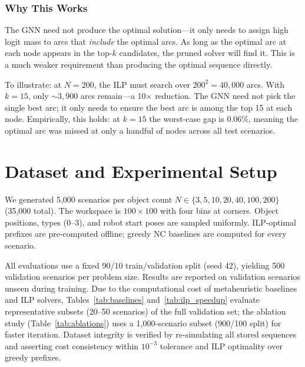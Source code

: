 \documentclass[conference]{IEEEtran}
\begin{document}
\subsubsection{Why This Works} The GNN need not produce the optimal solution---it only needs to assign high logit mass to arcs that \emph{include} the optimal arcs. As long as the optimal arc at each node appears in the top-$k$ candidates, the pruned solver will find it. This is a much weaker requirement than producing the optimal sequence directly.

To illustrate: at $N{=}200$, the ILP must search over $200^2 = 40{,}000$ arcs. With $k{=}15$, only ${\sim}3{,}900$ arcs remain---a 10$\times$ reduction. The GNN need not pick the single best arc; it only needs to ensure the best arc is among the top 15 at each node. Empirically, this holds: at $k{=}15$ the worst-case gap is 0.06\%, meaning the optimal arc was missed at only a handful of nodes across all test scenarios.

\section{Dataset and Experimental Setup}\label{sec:data}

We generated 5{,}000 scenarios per object count $N \in \{3, 5, 10, 20, 40, 100, 200\}$ (35{,}000 total). The workspace is $100 \times 100$ with four bins at corners. Object positions, types (0--3), and robot start poses are sampled uniformly. ILP-optimal prefixes are pre-computed offline; greedy NC baselines are computed for every scenario.

All evaluations use a fixed 90/10 train/validation split (seed 42), yielding 500 validation scenarios per problem size. Results are reported on validation scenarios unseen during training. Due to the computational cost of metaheuristic baselines and ILP solvers, Tables~\ref{tab:baselines} and~\ref{tab:ilp_speedup} evaluate representative subsets (20--50 scenarios) of the full validation set; the ablation study (Table~\ref{tab:ablations}) uses a 1{,}000-scenario subset (900/100 split) for faster iteration. Dataset integrity is verified by re-simulating all stored sequences and asserting cost consistency within $10^{-3}$ tolerance and ILP optimality over greedy prefixes.

\end{document}
